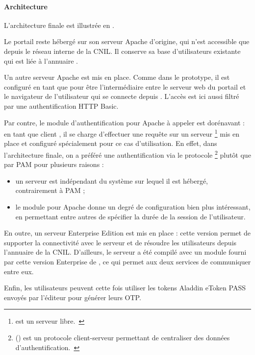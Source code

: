\paragraph{Architecture}
L'architecture finale est illustrée en .

Le portail \aintranet{} \atypo{} reste hébergé sur son serveur Apache d'origine, qui n'est accessible que depuis le réseau interne de la CNIL.
Il conserve sa base d'utilisateurs existante qui est liée à l'annuaire \aad{}.

Un autre serveur Apache est mis en place.
Comme dans le prototype, il est configuré en tant que \arp{} pour être l'intermédiaire entre le serveur web du portail et le navigateur de l'utilisateur qui se connecte depuis \ainternet{}.
L'accès est ici aussi filtré par une authentification HTTP Basic.

Par contre, le module d'authentification pour Apache à appeler est dorénavant \amodradius{} : en tant que client \aradius{}, il se charge d'effectuer une requête sur un serveur \afreerad{}\footnote{\afreerad{} est un serveur \aradius{} libre.~\cite{freeradius}} mis en place et configuré spécialement pour ce cas d'utilisation. 
En effet, dans l'architecture finale, on a préféré une authentification via le protocole \aradius{}\footnote{\aradius{} () est un protocole client-serveur permettant de centraliser des données d'authentification.~\cite{radius}} plutôt que par PAM pour plusieurs raisons :

\begin{itemize}
	\item un serveur \aradius{} est indépendant du système sur lequel il est hébergé, contrairement à PAM ;
	\item le module \amodradius{} pour Apache donne un degré de configuration bien plus intéressant, en permettant entre autres de spécifier la durée de la session de l'utilisateur.
\end{itemize}

En outre, un serveur \alinotp{} Enterprise Edition est mis en place : cette version permet de supporter la connectivité avec le serveur \aradius{} et de résoudre les utilisateurs depuis l'annuaire \aad{} de la CNIL.
D'ailleurs, le serveur \afreerad{} a été compilé avec un module fourni par cette version Enterprise de \alinotp{}, ce qui permet aux deux services de communiquer entre eux.

Enfin, les utilisateurs peuvent cette fois utiliser les tokens Aladdin eToken PASS envoyés par l'éditeur \alse{} pour générer leurs OTP.


